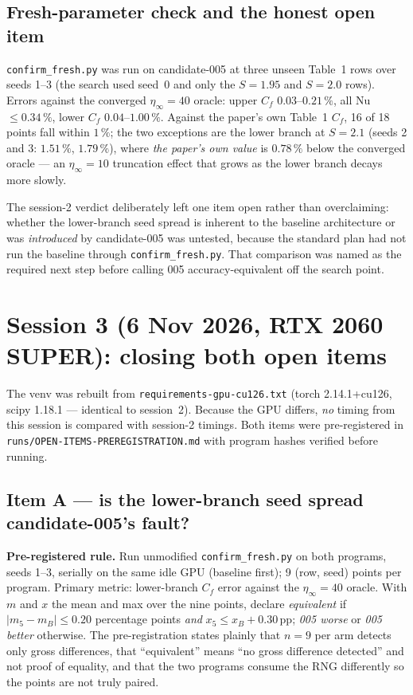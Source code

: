\documentclass[11pt,a4paper]{article}
\newcommand{\code}[1]{\texttt{\small #1}}
\newcommand{\pct}{\,\%}
\begin{document}
\subsection{Fresh-parameter check and the honest open item}
\code{confirm\_fresh.py} was run on candidate-005 at three unseen Table~1 rows over seeds
1--3 (the search used seed~0 and only the $S{=}1.95$ and $S{=}2.0$ rows). Errors against
the converged $\eta_\infty{=}40$ oracle: upper $C_f$ $0.03$--$0.21\pct$, all
$\mathrm{Nu}$ $\leq0.34\pct$, lower $C_f$ $0.04$--$1.00\pct$. Against the paper's own
Table~1 $C_f$, 16 of 18 points fall within $1\pct$; the two exceptions are the lower branch
at $S{=}2.1$ (seeds 2 and 3: $1.51\pct$, $1.79\pct$), where \emph{the paper's own value} is
$0.78\pct$ below the converged oracle --- an $\eta_\infty{=}10$ truncation effect that grows
as the lower branch decays more slowly.

The session-2 verdict deliberately left one item open rather than overclaiming: whether the
lower-branch seed spread is inherent to the baseline architecture or was \emph{introduced}
by candidate-005 was untested, because the standard plan had not run the baseline through
\code{confirm\_fresh.py}. That comparison was named as the required next step before calling
005 accuracy-equivalent off the search point.

\section{Session 3 (6 Nov 2026, RTX 2060 SUPER): closing both open items}

The venv was rebuilt from \code{requirements-gpu-cu126.txt} (torch 2.14.1+cu126, scipy
1.18.1 --- identical to session~2). Because the GPU differs, \emph{no} timing from this
session is compared with session-2 timings. Both items were pre-registered in
\code{runs/OPEN-ITEMS-PREREGISTRATION.md} with program hashes verified before running.

\subsection{Item A --- is the lower-branch seed spread candidate-005's fault?}
\textbf{Pre-registered rule.} Run unmodified \code{confirm\_fresh.py} on both programs,
seeds 1--3, serially on the same idle GPU (baseline first); 9 (row, seed) points per
program. Primary metric: lower-branch $C_f$ error against the $\eta_\infty{=}40$ oracle.
With $m$ and $x$ the mean and max over the nine points, declare \emph{equivalent} if
$|m_5-m_B|\leq0.20$ percentage points \emph{and} $x_5\leq x_B+0.30$\,pp; \emph{005 worse} or
\emph{005 better} otherwise. The pre-registration states plainly that $n=9$ per arm detects
only gross differences, that ``equivalent'' means ``no gross difference detected'' and not
proof of equality, and that the two programs consume the RNG differently so the points are
not truly paired.
\end{document}
